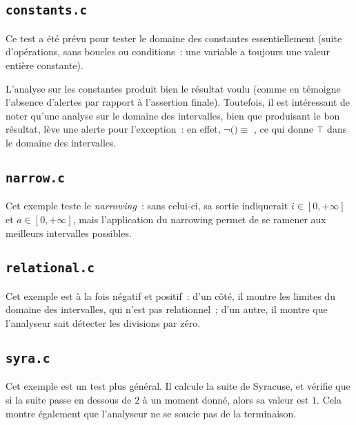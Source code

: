 \documentclass[11pt,a4paper]{article}
\begin{document}
\subsection{\texttt{constants.c}}
Ce test a été prévu pour tester le domaine des constantes
essentiellement (suite d'opérations, sans boucles ou conditions~: une variable
a toujours une valeur entière constante).

L'analyse sur les constantes produit bien le résultat voulu (comme en
témoigne l'absence d'alertes par rapport à l'assertion finale). Toutefois,
il est intéressant de noter qu'une analyse sur le domaine des intervalles,
bien que produisant le bon résultat, lève une alerte pour l'exception~:
en effet, $\neg ($$) \equiv$ , ce qui donne $\top$
dans le domaine des intervalles.

\subsection{\texttt{narrow.c}}
Cet exemple teste le \textit{narrowing}~: sans celui-ci, sa sortie indiquerait
$i \in [0, +\infty]$ et $a \in [0, +\infty]$, mais l'application du
narrowing permet de se ramener aux meilleurs intervalles possibles.

\subsection{\texttt{relational.c}}
Cet exemple est à la fois négatif et positif~: d'un côté, il montre
les limites du domaine des intervalles, qui n'est pas relationnel~;
d'un autre, il montre que l'analyseur sait détecter les divisions par zéro.

\subsection{\texttt{syra.c}}
Cet exemple est un test plus général. Il calcule la suite de Syracuse,
et vérifie que si la suite passe en dessous de $2$ à un moment donné, alors
sa valeur est $1$. Cela montre également que l'analyseur ne se soucie pas de
la terminaison.

{}

\end{document}
